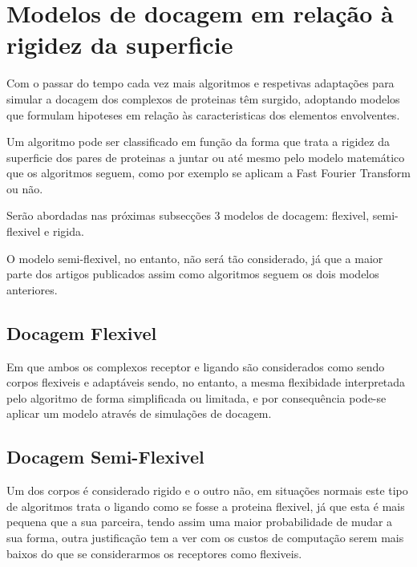 
\section{Modelos de docagem em relação à rigidez da superficie}
\label{classi}
Com o passar do tempo cada vez mais algoritmos e respetivas adaptações para simular a docagem dos complexos de proteinas têm surgido, adoptando modelos que formulam hipoteses em relação às caracteristicas dos elementos envolventes. 

Um algoritmo pode ser classificado em função da forma que trata a rigidez  da superficie dos pares de proteinas a juntar ou até mesmo pelo modelo matemático que os algoritmos seguem, como por exemplo se aplicam a Fast Fourier Transform ou não.

Serão abordadas nas próximas subsecções 3 modelos de docagem: flexivel, semi-flexivel e rigida. 

O modelo semi-flexivel, no entanto,  não será tão considerado, já que a maior parte dos artigos publicados assim como algoritmos seguem os dois modelos anteriores.



\subsection{Docagem Flexivel} Em que ambos os complexos receptor e ligando são considerados como sendo corpos flexiveis e adaptáveis sendo, no entanto, a mesma flexibidade interpretada pelo algoritmo de forma simplificada ou limitada, e por consequência pode-se aplicar um modelo através de simulações de docagem.

\subsection{Docagem Semi-Flexivel} Um dos corpos é considerado rigido e o outro não, em situações normais este tipo de algoritmos trata o ligando como se fosse a proteina flexivel, já que esta é mais pequena que a sua parceira, tendo assim uma maior probabilidade de mudar a sua forma, outra justificação tem a ver com os custos de computação serem mais baixos do que se considerarmos os receptores como flexiveis.

